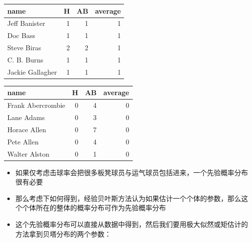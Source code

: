 \documentclass[]{book}
\newenvironment{Shaded}{\begin{snugshade}}{\end{snugshade}}
\newcommand{\CommentTok}[1]{\textcolor[rgb]{0.56,0.35,0.01}{\textit{#1}}}
\newcommand{\DecValTok}[1]{\textcolor[rgb]{0.00,0.00,0.81}{#1}}
\newcommand{\KeywordTok}[1]{\textcolor[rgb]{0.13,0.29,0.53}{\textbf{#1}}}
\newcommand{\NormalTok}[1]{#1}
\newcommand{\OperatorTok}[1]{\textcolor[rgb]{0.81,0.36,0.00}{\textbf{#1}}}
\newcommand{\StringTok}[1]{\textcolor[rgb]{0.31,0.60,0.02}{#1}}
\begin{document}
\begin{Shaded}
\end{Shaded}

\begin{tabular}{l|r|r|r}
\hline
name & H & AB & average\\
\hline
Jeff Banister & 1 & 1 & 1\\
\hline
Doc Bass & 1 & 1 & 1\\
\hline
Steve Biras & 2 & 2 & 1\\
\hline
C. B. Burns & 1 & 1 & 1\\
\hline
Jackie Gallagher & 1 & 1 & 1\\
\hline
\end{tabular}

\begin{Shaded}
\end{Shaded}

\begin{tabular}{l|r|r|r}
\hline
name & H & AB & average\\
\hline
Frank Abercrombie & 0 & 4 & 0\\
\hline
Lane Adams & 0 & 3 & 0\\
\hline
Horace Allen & 0 & 7 & 0\\
\hline
Pete Allen & 0 & 4 & 0\\
\hline
Walter Alston & 0 & 1 & 0\\
\hline
\end{tabular}

\begin{itemize}
\item
  如果仅考虑击球率会把很多板凳球员与运气球员包括进来，一个先验概率分布很有必要
\item
  那么考虑下如何得到，经验贝叶斯方法认为如果估计一个个体的参数，那么这个个体所在的整体的概率分布可作为先验概率分布
\item
  这个先验概率分布可以直接从数据中得到，然后我们要用极大似然或矩估计的方法拿到贝塔分布的两个参数：
\end{itemize}
\end{document}
